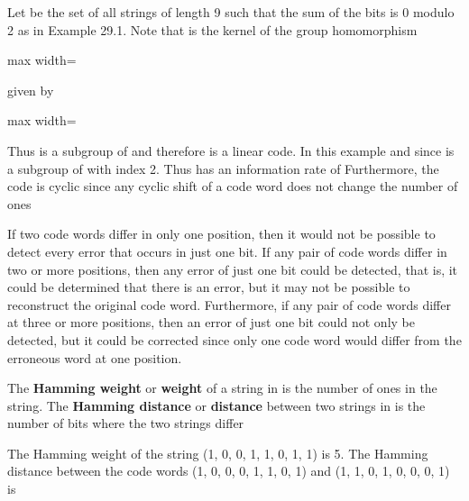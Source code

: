 \documentclass[11pt,oneside]{article}
\begin{document}
\begin{BookBody}
 Let  be the set of all strings of length 9 such that the sum of the bits is 0 modulo 2 as in Example 29.1. Note that  is the kernel of the group homomorphism

\begin{center}\begin{adjustbox}{max width=\linewidth}\end{adjustbox}\end{center}

\noindent given by

\begin{center}\begin{adjustbox}{max width=\linewidth}\end{adjustbox}\end{center}

\noindent Thus  is a subgroup of  and therefore  is a linear code. In this example and  since  is a subgroup of  with index 2. Thus  has an information rate of  Furthermore, the code is cyclic since any cyclic shift of a code word does not change the number of ones\BookEnd{\blacktriangle}

If two code words differ in only one position, then it would not be possible to detect every error that occurs in just one bit. If any pair of code words differ in two or more positions, then any error of just one bit could be detected, that is, it could be determined that there is an error, but it may not be possible to reconstruct the original code word. Furthermore, if any pair of code words differ at three or more positions, then an error of just one bit could not only be detected, but it could be corrected since only one code word would differ from the erroneous word at one position.

 The\textbf{ Hamming weight} or\textbf{ weight} of a string in  is the number of ones in the string. The\textbf{ Hamming distance} or\textbf{ distance} between two strings in  is the number of bits where the two strings differ\BookEnd{\blacksquare}

 The Hamming weight of the string (1, 0, 0, 1, 1, 0, 1, 1) is 5. The Hamming distance between the code words (1, 0, 0, 0, 1, 1, 0, 1) and (1, 1, 0, 1, 0, 0, 0, 1) is \BookEnd{\blacktriangle}

\end{BookBody}
\end{document}
